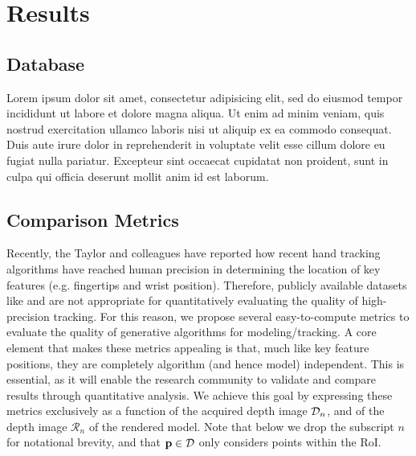 \clearpage
\section{Results}



\subsection{Database}
\begin{DRAFT}
Lorem ipsum dolor sit amet, consectetur adipisicing elit, sed do eiusmod tempor incididunt ut labore et dolore magna aliqua. Ut enim ad minim veniam, quis nostrud exercitation ullamco laboris nisi ut aliquip ex ea commodo consequat. Duis aute irure dolor in reprehenderit in voluptate velit esse cillum dolore eu fugiat nulla pariatur. Excepteur sint occaecat cupidatat non proident, sunt in culpa qui officia deserunt mollit anim id est laborum.
\end{DRAFT}

\providecommand{\depthrend}{\mathcal{R}}
\providecommand{\metricone}{E_\text{3D}}
\providecommand{\metrictwo}{E_\text{2D}}

\subsection{Comparison Metrics}
Recently, the Taylor and colleagues  have reported how recent hand tracking algorithms \cite{sharp2015accurate} \cite{tagliasacchi2015robust} have reached human precision in determining the location of key features (e.g. fingertips and wrist position). Therefore, publicly available datasets like \cite{tompson2014real} and \cite{sridhar2013multicam} are not appropriate for quantitatively evaluating the quality of high-precision tracking. 
% 
For this reason, we propose several easy-to-compute metrics to evaluate the quality of generative algorithms for modeling/tracking. A core element that makes these metrics appealing is that, much like key feature positions, they are completely algorithm (and hence model) independent. This is essential, as it will enable the research community to validate and compare results through quantitative analysis. 
% 
We achieve this goal by expressing these metrics exclusively as a function of the acquired depth image $\mathcal{D}_n$, and of the depth image $\depthrend_{n}$ of the rendered model. Note that below we drop the subscript $n$ for notational brevity, and that $\mathbf{p} \in \mathcal{D}$ only considers points within the RoI. 


